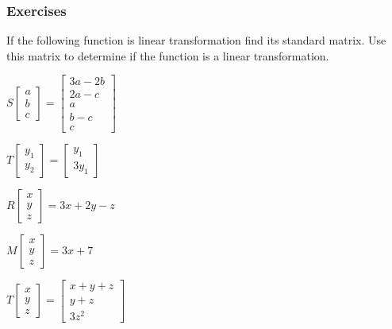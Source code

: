 \subsubsection{Exercises}

\begin{exercise} If the following function is linear transformation find its standard matrix. Use this matrix to determine if the function is a linear transformation.\\
\begin{inparaenum}[a)]
\item $S\begin{bmatrix}a\\b\\c\end{bmatrix}=\begin{bmatrix}3a-2b \\ 2a-c \\ a \\ b-c \\ c \end{bmatrix}$ \hfill
\item $T\begin{bmatrix} y_1 \\ y_2 \end{bmatrix} = \begin{bmatrix} y_1 \\ 3 y_1 \end{bmatrix}$ \hfill {} \\
\item $R\begin{bmatrix}x \\ y \\ z \end{bmatrix} = 3x+2y-z$ \hfill 
\item $M\begin{bmatrix}x \\ y \\ z \end{bmatrix} = 3x+7$ \hfill {} \\
\item $T\begin{bmatrix}x \\ y \\ z \end{bmatrix} = \begin{bmatrix} x+y+z \\ y+z \\ 3z^2 \end{bmatrix}$ \hfill 

\end{inparaenum}
\end{exercise}
